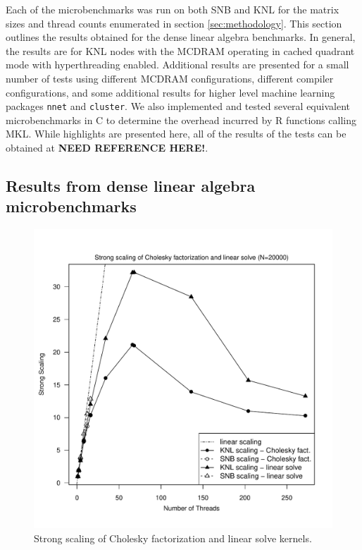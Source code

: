 Each of the microbenchmarks was run on both SNB and KNL for the matrix sizes and thread
counts enumerated in section \ref{sec:methodology}. This section outlines the results
obtained for the dense linear algebra benchmarks. In general, the results are for KNL
nodes with the MCDRAM operating in cached quadrant mode with hyperthreading enabled.
Additional results are presented for a small number of tests using different MCDRAM
configurations, different compiler configurations, and some additional results for higher
level machine learning packages \texttt{nnet} and \texttt{cluster}. We also implemented
and tested several equivalent microbenchmarks in C to determine the overhead incurred by R
functions calling MKL. While highlights are presented here, all of the results of the
tests can be obtained at {\bf NEED REFERENCE HERE!}.

\subsection{Results from dense linear algebra microbenchmarks}

\begin{figure}
\includegraphics[height=\columnwidth, width=\columnwidth]{chol_solve_20000_272-ss.pdf}
\caption{Strong scaling of Cholesky factorization and linear solve kernels.}
\label{fig:cholSolveScale}
\end{figure}

